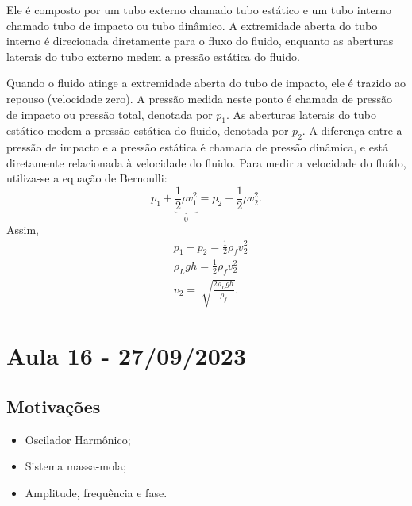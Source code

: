 \documentclass{article}
\begin{document}
Ele é composto por um tubo externo chamado tubo estático e um tubo interno
chamado tubo de impacto ou tubo dinâmico. A extremidade aberta do tubo interno
é direcionada diretamente para o fluxo do fluido, enquanto as aberturas laterais
do tubo externo medem a pressão estática do fluido. 

Quando o fluido atinge a extremidade aberta do tubo de impacto, ele é trazido
ao repouso (velocidade zero). A pressão medida neste ponto é chamada de pressão 
de impacto ou pressão total, denotada por \(p_{1}\). As aberturas laterais do tubo estático medem a pressão
estática do fluido, denotada por \(p_{2}\). A diferença entre a pressão de impacto e a pressão estática é chamada
de pressão dinâmica, e está diretamente relacionada à velocidade do fluido. Para medir a velocidade
do fluído, utiliza-se a equação de Bernoulli: 
\[
  p_{1} + \underbrace{\frac{1}{2}\rho v_{1}^{2}}_{0} = p_{2} + \frac{1}{2}\rho v_{2}^{2}.
\]
Assim,
\begin{align*}
   &p_{1}-p_{2} = \frac{1}{2}\rho_{f}v_{2}^{2}\\
   &\rho_{L}gh = \frac{1}{2}\rho_{f}v_{2}^{2}\\
   &v_{2} = \sqrt[]{\frac{2\rho_{L}gh}{\rho_{f}}}.
\end{align*}
\newpage

\section{Aula 16 - 27/09/2023}
\subsection{Motivações}
\begin{itemize}
  \item Oscilador Harmônico;
  \item Sistema massa-mola;
  \item Amplitude, frequência e fase.
\end{itemize}
\end{document}
